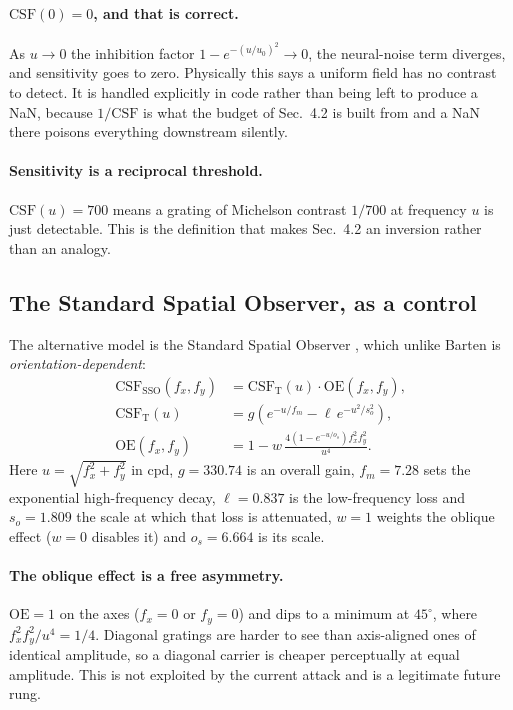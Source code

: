 \documentclass[11pt,a4paper]{article}
\newcommand{\cpd}{\mathrm{cpd}}
\begin{document}
\paragraph{$\mathrm{CSF}(0)=0$, and that is correct.}
As $u\to0$ the inhibition factor $1-e^{-(u/u_0)^2}\to0$, the neural-noise
term diverges, and sensitivity goes to zero. Physically this says a uniform
field has no contrast to detect. It is handled explicitly in code rather
than being left to produce a NaN, because $1/\mathrm{CSF}$ is what the
budget of Sec.~4.2 is built from and a NaN there poisons everything
downstream silently.

\paragraph{Sensitivity is a reciprocal threshold.}
$\mathrm{CSF}(u)=700$ means a grating of Michelson contrast $1/700$ at
frequency $u$ is just detectable. This is the definition that makes
Sec.~4.2 an inversion rather than an analogy.

\subsection{The Standard Spatial Observer, as a control}

The alternative model is the Standard Spatial Observer
\citep{watson2005sso,watson2000five}, which unlike Barten is
\emph{orientation-dependent}:
\begin{align}
  \mathrm{CSF}_{\mathrm{SSO}}(f_x,f_y) &=
      \mathrm{CSF}_{\mathrm{T}}(u)\cdot \mathrm{OE}(f_x,f_y),
      \label{eq:sso}\\
  \mathrm{CSF}_{\mathrm{T}}(u) &= g\left(e^{-u/f_m}
      - \ell\, e^{-u^2/s_o^2}\right), \label{eq:tyler}\\
  \mathrm{OE}(f_x,f_y) &= 1 - w\,
      \frac{4\left(1-e^{-u/o_s}\right)f_x^2f_y^2}{u^4}. \label{eq:oblique}
\end{align}
Here $u=\sqrt{f_x^2+f_y^2}$ in $\cpd$, $g=330.74$ is an overall gain,
$f_m=7.28$ sets the exponential high-frequency decay, $\ell=0.837$ is the
low-frequency loss and $s_o=1.809$ the scale at which that loss is
attenuated, $w=1$ weights the oblique effect ($w=0$ disables it) and
$o_s=6.664$ is its scale.

\paragraph{The oblique effect is a free asymmetry.}
$\mathrm{OE}=1$ on the axes ($f_x=0$ or $f_y=0$) and dips to a minimum at
$45^\circ$, where $f_x^2f_y^2/u^4=1/4$. Diagonal gratings are harder to see
than axis-aligned ones of identical amplitude, so a diagonal carrier is
cheaper perceptually at equal amplitude. This is not exploited by the
current attack and is a legitimate future rung.
\end{document}
